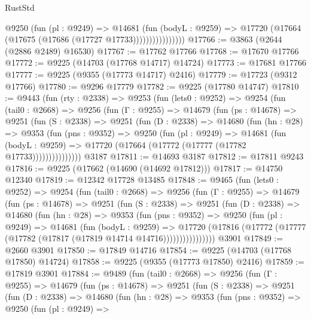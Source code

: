 \begin{lexlean}{RustStd}
\begin{coremodule}
                      @9250
                        (fun (pl : @9249) =>
                        @14681
                          (fun (bodyL : @9259) =>
                          @17720 (@17664 (@17675 (@17686 (@17727 @17733))))))))))))))))
@17766 := @3863 (@2644 (@2886 @2489) @16530)
@17767 := @17762 @17766
@17768 := @17670 @17766
@17772 := @9225 (@14703 (@17768 @14717) @14724)
@17773 := @17681 @17766
@17777 := @9225 (@9355 (@17773 @14717) @2416)
@17779 := @17723 (@9312 @17766)
@17780 := @9296 @17779
@17782 := @9225 (@17780 @14747)
@17810 := @9443
    (fun (rty : @2338) =>
    @9253
      (fun (lets0 : @9252) =>
      @9254
        (fun (tail0 : @2668) =>
        @9256
          (fun (Γ : @9255) =>
          @14679
            (fun (ps : @14678) =>
            @9251
              (fun (S : @2338) =>
              @9251
                (fun (D : @2338) =>
                @14680
                  (fun (hn : @28) =>
                  @9353
                    (fun (pns : @9352) =>
                    @9250
                      (fun (pl : @9249) =>
                      @14681
                        (fun (bodyL : @9259) =>
                        @17720 (@17664 (@17772 (@17777 (@17782 @17733)))))))))))))))
    @3187
@17811 := @14693 @3187
@17812 := @17811 @9243
@17816 := @9225 (@17662 (@14690 (@14692 @17812)))
@17817 := @14750 @12340
@17819 := @12342 @17728 @13485
@17848 := @9465
    (fun (lets0 : @9252) =>
    @9254
      (fun (tail0 : @2668) =>
      @9256
        (fun (Γ : @9255) =>
        @14679
          (fun (ps : @14678) =>
          @9251
            (fun (S : @2338) =>
            @9251
              (fun (D : @2338) =>
              @14680
                (fun (hn : @28) =>
                @9353
                  (fun (pns : @9352) =>
                  @9250
                    (fun (pl : @9249) =>
                    @14681
                      (fun (bodyL : @9259) =>
                      @17720
                        (@17816
                          (@17772 (@17777 (@17782 (@17817 (@17819 @14714 @14716))))))))))))))))
    @3901
@17849 := @2660 @3901
@17850 := @17849 @14716
@17854 := @9225 (@14703 (@17768 @17850) @14724)
@17858 := @9225 (@9355 (@17773 @17850) @2416)
@17859 := @17819 @3901
@17884 := @9489
    (fun (tail0 : @2668) =>
    @9256
      (fun (Γ : @9255) =>
      @14679
        (fun (ps : @14678) =>
        @9251
          (fun (S : @2338) =>
          @9251
            (fun (D : @2338) =>
            @14680
              (fun (hn : @28) =>
              @9353
                (fun (pns : @9352) =>
                @9250
                  (fun (pl : @9249) =>

\end{coremodule}
\end{lexlean}

